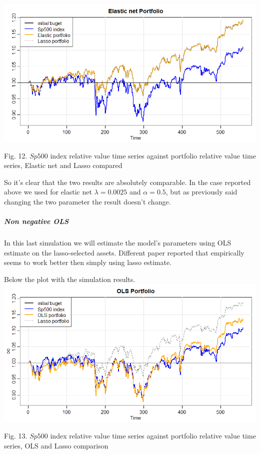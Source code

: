 \documentclass{article}%
\begin{document}
\includegraphics[scale=0.55]{elasticportfolio}
\begin{center}
\begin{small}
Fig. 12. $Sp500$ index relative value time series against portfolio relative value time series, Elastic net and Lasso compared
\\

\end{small}
\end{center}


So it's clear that the two results are absolutely comparable. In the case reported above we used for elastic net $\lambda=0.0025$ and $\alpha=0.5$, but as previously said changing the two parameter the result doesn't change.

\subparagraph{Non negative OLS}
In this last simulation we will estimate the model's parameters using OLS estimate on the lasso-selected assets. Different paper reported that empirically seems to work better then simply using lasso estimate. 

Below the plot with the simulation results.
\\

\includegraphics[scale=0.55]{olsportfolio}
\begin{center}
\begin{small}
Fig. 13. $Sp500$ index relative value time series against portfolio relative value time series, OLS and Lasso comparison
\\

\end{small}
\end{center}
\end{document}
